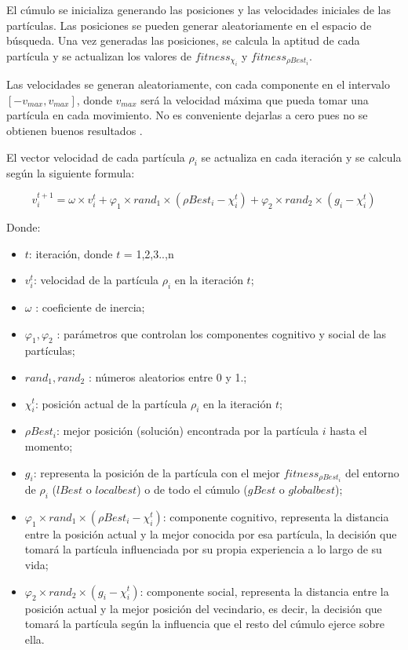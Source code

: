 El cúmulo se inicializa generando las posiciones y las velocidades iniciales de las partículas. Las posiciones se pueden generar aleatoriamente en el espacio de búsqueda. Una vez generadas las posiciones, se calcula la aptitud de cada partícula y se actualizan los valores de $fitness_{\chi_i}$ y $fitness_{\rho{Best_i}}$.

Las velocidades se generan aleatoriamente, con cada componente en el intervalo $[-v_{max}, v_{max}]$, donde $v_{max}$ será la velocidad máxima que pueda tomar una partícula en cada movimiento. No es conveniente dejarlas a cero pues no se obtienen buenos resultados \cite{swarmintelligence}.

El vector velocidad de cada partícula $\rho_i$ se actualiza en cada iteración y se calcula según la siguiente formula:

\begin{equation}\label{velocidad}
    v^{t+1}_i = \omega \times v^{t}_i + \varphi_1 \times rand_1 \times (\rho{Best_i} - \chi^{t}_i) + \varphi_2 \times rand_2 \times (g_i - \chi^{t}_i)
\end{equation}

Donde:
\begin{itemize} 
    \item $t$: iteración, donde $t$ = 1,2,3..,n
    \item $v^{t}_i$: velocidad de la partícula $\rho_i$ en la iteración $t$;
    \item $\omega$ :  coeficiente de inercia;
    \item $\varphi_1, \varphi_2$ : parámetros que controlan los componentes cognitivo y social de las partículas;
    \item $rand_1, rand_2$ : números aleatorios entre 0 y 1.;
    \item $\chi^{t}_i$: posición actual de la partícula $\rho_i$ en la iteración $t$;
    \item $\rho{Best_i}$: mejor posición (solución) encontrada por la partícula $i$ hasta el momento;
    \item $g_i$: representa la posición de la partícula con el mejor $fitness_{\rho{Best_i}}$ del entorno de $\rho_i$ ($lBest$ o $localbest$) o de todo el cúmulo ($gBest$ o $globalbest$);
    \item $\varphi_1 \times rand_1 \times (\rho{Best_i} - \chi^{t}_i)$: componente cognitivo, representa la distancia entre la posición actual y la mejor conocida por esa partícula, la decisión que tomará la partícula influenciada por su propia experiencia a lo largo de su vida;
    \item $\varphi_2 \times rand_2 \times (g_i - \chi^{t}_i)$: componente social, representa la distancia entre la posición actual y la mejor posición del vecindario, es decir, la decisión que tomará la partícula según la influencia que el resto del cúmulo ejerce sobre ella.
\end{itemize}

